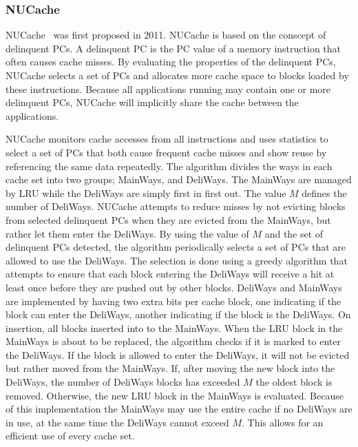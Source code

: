 \subsubsection{NUCache}

NUCache~\cite{Manikantan2011} was first proposed in 2011.
NUCache is based on the conscept of delinquent PCs.
A delinquent PC is the PC value of a memory instruction that often causes cache misses.
By evaluating the properties of the delinquent PCs, NUCache selects a set of PCs and allocates more cache space to blocks loaded by these instructions.
Because all applications running may contain one or more delinquent PCs, NUCache will implicitly share the cache between the applications.


NUCache monitors cache accesses from all instructions and uses statistics to select a set of PCs that both cause frequent cache misses and show reuse by referencing the same data repeatedly.
The algorithm divides the ways in each cache set into two groups; MainWays, and DeliWays.
The MainWays are managed by LRU while the DeliWays are simply first in first out.
The value $M$ defines the number of DeliWays.
NUCache attempts to reduce misses by not evicting blocks from selected delinquent PCs when they are evicted from the MainWays, but rather let them enter the DeliWays.
By using the value of $M$ and the set of delinquent PCs detected, the algorithm periodically selects a set of PCs that are allowed to use the DeliWays.
The selection is done using a greedy algorithm that attempts to ensure that each block entering the DeliWays will receive a hit at least once before they are pushed out by other blocks.
DeliWays and MainWays are implemented by having two extra bits per cache block, one indicating if the block can enter the DeliWays, another indicating if the block is the DeliWays.
On insertion, all blocks inserted into to the MainWays.
When the LRU block in the MainWays is about to be replaced, the algorithm checks if it is marked to enter the DeliWays.
If the block is allowed to enter the DeliWays, it will not be evicted but rather moved from the MainWays.
If, after moving the new block into the DeliWays, the number of DeliWays blocks has exceeded $M$ the oldest block is removed.
Otherwise, the new LRU block in the MainWays is evaluated.
Because of this implementation the MainWays may use the entire cache if no DeliWays are in use, at the same time the DeliWays cannot exceed $M$.
This allows for an efficient use of every cache set.

